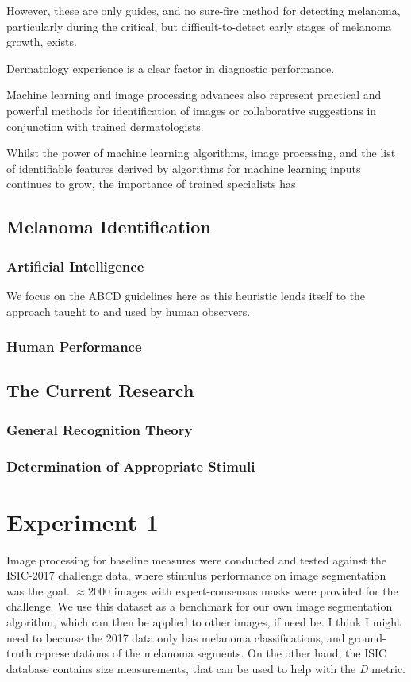 \documentclass[a4paper, natbib, doc, 12pt]{apa7}
\begin{document}
However, these are only guides, and no sure-fire method for detecting melanoma, particularly during the critical, but difficult-to-detect early stages of melanoma growth, exists. 

Dermatology experience is a clear factor in diagnostic performance. 

Machine learning and image processing advances also represent practical and powerful methods for identification of images or collaborative suggestions in conjunction with trained dermatologists. 

Whilst the power of machine learning algorithms, image processing, and the list of identifiable features derived by algorithms for machine learning inputs continues to grow, the importance of trained specialists has

\subsection{Melanoma Identification}
\subsubsection{Artificial Intelligence}
We focus on the ABCD guidelines here as this heuristic lends itself to the approach taught to and used by human observers. 

\subsubsection{Human Performance}
\subsection{The Current Research}
\subsubsection{General Recognition Theory}
\subsubsection{Determination of Appropriate Stimuli}
\section{Experiment 1}
Image processing for baseline measures were conducted and tested against the ISIC-2017 challenge data, where stimulus performance on image segmentation was the goal. $\approx2000$ images with expert-consensus masks were provided for the challenge. We use this dataset as a benchmark for our own image segmentation algorithm, which can then be applied to other images, if need be. I think I might need to because the 2017 data only has melanoma classifications, and ground-truth representations of the melanoma segments. On the other hand, the ISIC database contains size measurements, that can be used to help with the \textit{D} metric. 
\end{document}
